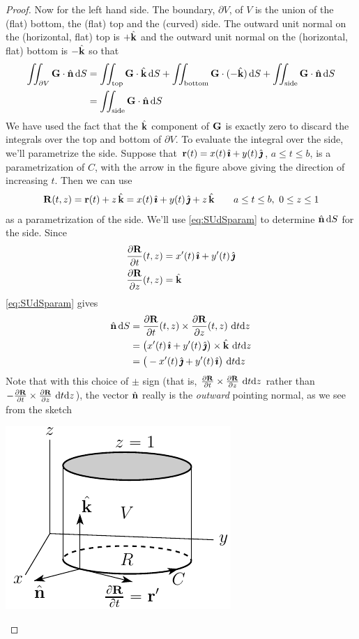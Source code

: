 \begin{proof}
Now for the left hand side. The boundary, $\partial V$, of $V$ is the union 
of the (flat) bottom, the (flat) top and the (curved) side.
The outward unit normal on the (horizontal, flat) top is $+\hat{\mathbf{k}}$ and
the outward unit normal on the (horizontal, flat) bottom is $-\hat{\mathbf{k}}$  so that
\begin{align*}
\iint_{\partial V} \mathbf{G}\cdot\hat{\mathbf{n}}\,\mathrm{d}S
&=\iint_{\text{top}} \mathbf{G}\cdot\hat{\mathbf{k}}\,\mathrm{d}S
   +\iint_{\text{bottom}} \mathbf{G}\cdot(-\hat{\mathbf{k}})\,\mathrm{d}S
   +\iint_{\text{side}} \mathbf{G}\cdot\hat{\mathbf{n}}\,\mathrm{d}S \\
&=\iint_{\text{side}} \mathbf{G}\cdot\hat{\mathbf{n}}\,\mathrm{d}S 
\end{align*}
We have used the fact that the $\hat{\mathbf{k}}$ component of $\mathbf{G}$ is exactly zero
to discard the integrals over the top and bottom of $\partial V$. 
To evaluate the integral over the side, we'll parametrize the side. Suppose that 
$\mathbf{r}(t)=x(t)\,\hat{\pmb{\imath}} +y(t)\,\hat{\pmb{\jmath}}$, $a\le t\le b$,
is a parametrization of $C$, with the arrow in the figure above giving the
direction of increasing $t$. Then we can use
\begin{align*}
\mathbf{R}(t,z)  = \mathbf{r}(t) +z\,\hat{\mathbf{k}}
          = x(t)\,\hat{\pmb{\imath}} +y(t)\,\hat{\pmb{\jmath}} +z\,\hat{\mathbf{k}} \qquad a\le t\le b,\ 0\le z\le 1
\end{align*}
as a parametrization of the side. We'll use \eqref{eq:SUdSparam} to determine
$\hat{\mathbf{n}}\,\mathrm{d}S$ for the side. Since
\begin{align*}
\frac{\partial\mathbf{R}}{\partial t}(t,z) & = x'(t)\,\hat{\pmb{\imath}} +y'(t)\,\hat{\pmb{\jmath}} \\
\frac{\partial\mathbf{R}}{\partial z}(t,z) & = \hat{\mathbf{k}} 
\end{align*}
\eqref{eq:SUdSparam} gives
\begin{align*}
\hat{\mathbf{n}}\,\mathrm{d}S &= \frac{\partial\mathbf{R}}{\partial t}(t,z)\times 
               \frac{\partial\mathbf{R}}{\partial z}(t,z)\ \mathrm{d}t\mathrm{d}z \\
&= \big(x'(t)\,\hat{\pmb{\imath}} +y'(t)\,\hat{\pmb{\jmath}}\big)\times \hat{\mathbf{k}}\ \mathrm{d}t\mathrm{d}z \\
&= \big(-x'(t)\,\hat{\pmb{\jmath}} +y'(t)\,\hat{\pmb{\imath}}\big)\ \mathrm{d}t\mathrm{d}z
\end{align*}
Note that with this choice of $\pm$ sign (that is, 
$\frac{\partial\mathbf{R}}{\partial t}\times 
               \frac{\partial\mathbf{R}}{\partial z}\ \mathrm{d}t\mathrm{d}z$
rather than
$-\frac{\partial\mathbf{R}}{\partial t}\times 
               \frac{\partial\mathbf{R}}{\partial z}\ \mathrm{d}t\mathrm{d}z$), the vector
$\hat{\mathbf{n}}$ really is the \emph{outward} pointing normal, as we see from the sketch
\begin{nfig}
\begin{center}
    \includegraphics{greens3.pdf}

\end{center}
\end{nfig}
\end{proof}
